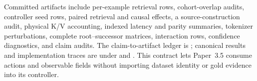 \documentclass[11pt]{article}
\begin{document}
Committed artifacts include per-example retrieval rows, cohort-overlap audits, controller seed rows, paired retrieval and causal effects, a source-construction audit, physical K/V accounting, indexed latency and parity summaries, tokenizer perturbations, complete root--successor matrices, interaction rows, confidence diagnostics, and claim audits. The claim-to-artifact ledger is ; canonical results and implementation traces are under  and . This contract lets Paper~3.5 consume actions and observable fields without importing dataset identity or gold evidence into its controller.



\end{document}
